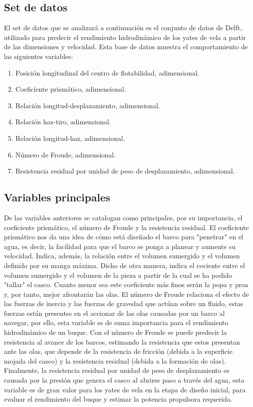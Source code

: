 \documentclass[twoside]{article}
\begin{document}
\begin{multicols}{2}
\section{Set de datos}
El set de datos que se analizar\'a a continuaci\'on es el conjunto de datos de Delft, utilizado para predecir el rendimiento hidrodin\'amico de los yates de vela a partir de las dimensiones y velocidad. Esta base de datos muestra el comportamiento de las siguientes variables:
\begin{enumerate}
\item Posici\'on longitudinal del centro de flotabilidad, adimensional.
\item Coeficiente prism\'atico, adimensional.
\item Relaci\'on longitud-desplazamiento, adimensional.
\item Relaci\'on haz-tiro, adimensional.
\item Relaci\'on longitud-haz, adimensional.
\item N\'umero de Froude, adimensional.
\item Resistencia residual por unidad de peso de desplazamiento, adimensional.\\
\end{enumerate}

\subsection{Variables principales}
De las variables anteriores se catalogan como principales, por su importancia, el coeficiente prism\'atico, el n\'umero de Froude y la resistencia residual. El coeficiente prism\'atico nos da una idea de c\'omo est\'a dise\~nado el barco para "penetrar" en el agua, es decir, la facilidad para que el barco se ponga a planear y aumente su velocidad. Indica, adem\'as, la relaci\'on entre el volumen sumergido y el volumen definido por su manga m\'axima. Dicho de otra manera, indica el cociente entre el volumen sumergido y el volumen de la pieza a partir de la cual se ha podido "tallar" el casco. Cuanto menor sea este coeficiente m\'as finos ser\'an la popa y proa y, por tanto, mejor afrontar\'an las olas. El n\'umero de Froude relaciona el efecto de las fuerzas de inercia y las fuerzas de gravedad que act\'uan sobre un fluido, estas fuerzas est\'an presentes en el accionar de las olas causadas por un barco al navegar, por ello, esta variable es de suma importancia para el rendimiento hidrodin\'amico de un buque. Con el n\'umero de Froude se puede predecir la resistencia al avance de los barcos, estimando la resistencia que estos presentan ante las olas, que depende de la resistencia de fricci\'on (debida a la superficie mojada del casco) y la resistencia residual (debida a la formaci\'on de olas). Finalmente, la resistencia residual por unidad de peso de desplazamiento es causada por la presi\'on que genera el casco al abrirse paso a trav\'es del agua, esta variable es de gran valor para los yates de vela en la etapa de dise\~no inicial,  para evaluar el rendimiento del buque y estimar la potencia propulsora requerida.\\






\end{multicols}
\end{document}
